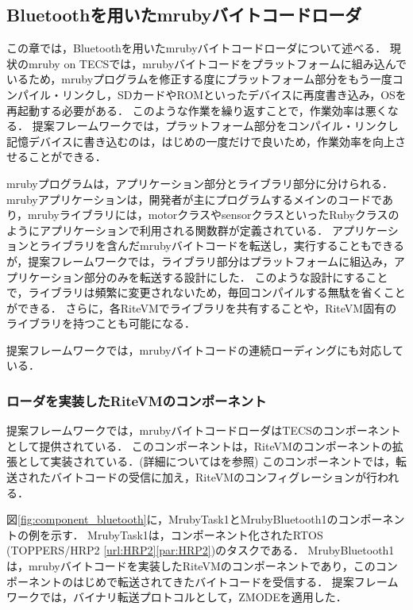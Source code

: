 \documentclass[submit]{ipsj_v2/UTF8/ipsj}
\begin{document}
\subsection{Bluetoothを用いたmrubyバイトコードローダ}
\label{sec:mruby bytecode loader using Bluetooth}
この章では，Bluetoothを用いたmrubyバイトコードローダについて述べる．
現状のmruby on TECSでは，mrubyバイトコードをプラットフォームに組み込んでいるため，mrubyプログラムを修正する度にプラットフォーム部分をもう一度コンパイル・リンクし，SDカードやROMといったデバイスに再度書き込み，OSを再起動する必要がある．
このような作業を繰り返すことで，作業効率は悪くなる．
提案フレームワークでは，プラットフォーム部分をコンパイル・リンクし記憶デバイスに書き込むのは，はじめの一度だけで良いため，作業効率を向上させることができる．

mrubyプログラムは，アプリケーション部分とライブラリ部分に分けられる．
mrubyアプリケーションは，開発者が主にプログラムするメインのコードであり，mrubyライブラリには，motorクラスやsensorクラスといったRubyクラスのようにアプリケーションで利用される関数群が定義されている．
アプリケーションとライブラリを含んだmrubyバイトコードを転送し，実行することもできるが，提案フレームワークでは，ライブラリ部分はプラットフォームに組込み，アプリケーション部分のみを転送する設計にした．
このような設計にすることで，ライブラリは頻繁に変更されないため，毎回コンパイルする無駄を省くことができる．
さらに，各RiteVMでライブラリを共有することや，RiteVM固有のライブラリを持つことも可能になる．

提案フレームワークでは，mrubyバイトコードの連続ローディングにも対応している．

\subsubsection{ローダを実装したRiteVMのコンポーネント}
提案フレームワークでは，mrubyバイトコードローダはTECSのコンポーネントとして提供されている．
このコンポーネントは，RiteVMのコンポーネントの拡張として実装されている．(詳細については\cite{par:mrubyonTECS}を参照)
このコンポーネントでは，転送されたバイトコードの受信に加え，RiteVMのコンフィグレーションが行われる．

図\ref{fig:component_bluetooth}に，MrubyTask1とMrubyBluetooth1のコンポーネントの例を示す．
MrubyTask1は，コンポーネント化されたRTOS (TOPPERS/HRP2 \ref{url:HRP2}\ref{par:HRP2})のタスクである．
MrubyBluetooth1は，mrubyバイトコードを実装したRiteVMのコンポーネントであり，このコンポーネントのはじめで転送されてきたバイトコードを受信する．
提案フレームワークでは，バイナリ転送プロトコルとして，ZMODEを適用した．
\end{document}
